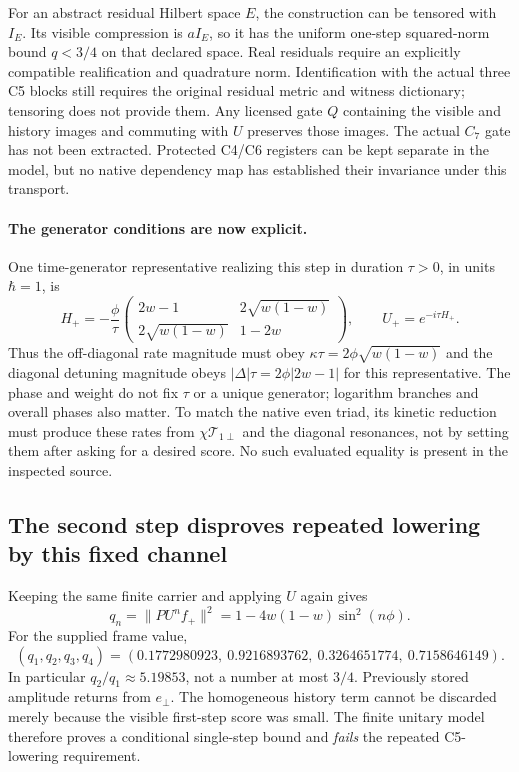 \documentclass[11pt,a4paper]{article}
\begin{document}
For an abstract residual Hilbert space $E$, the construction can
be tensored with $I_E$. Its visible compression is $aI_E$, so it
has the uniform one-step squared-norm bound $q<3/4$ on that
declared space. Real residuals require an explicitly compatible
realification and quadrature norm. Identification with the actual
three C5 blocks still requires the original residual metric and
witness dictionary; tensoring does not provide them.
Any licensed gate $Q$ containing the visible and history images
and commuting with $U$ preserves those images. The actual $C_7$
gate has not been extracted. Protected C4/C6 registers can be
kept separate in the model, but no native dependency map has
established their invariance under this transport.

\paragraph{The generator conditions are now explicit.}
One time-generator representative realizing this step in duration
$\tau>0$, in units $\hbar=1$, is
\[
 H_+=-\frac{\phi}{\tau}
 \begin{pmatrix}
 2w-1&2\sqrt{w(1-w)}\\
 2\sqrt{w(1-w)}&1-2w
 \end{pmatrix},\qquad U_+=e^{-i\tau H_+}.
\]
Thus the off-diagonal rate magnitude must obey
$\kappa\tau=2\phi\sqrt{w(1-w)}$ and the diagonal detuning
magnitude obeys $|\Delta|\tau=2\phi|2w-1|$ for this representative.
The phase and weight do not fix $\tau$ or a unique generator;
logarithm branches and overall phases also matter. To match the
native even triad, its kinetic reduction must produce these rates
from $\chi\mathcal T_{1\perp}$ and the diagonal resonances,
not by setting them after asking for a desired score.
No such evaluated equality is present in the inspected source.

\subsection{The second step disproves repeated lowering by this fixed channel}

Keeping the same finite carrier and applying $U$ again gives
\[
 q_n=\|PU^nf_+\|^2
     =1-4w(1-w)\sin^2(n\phi).
\]
For the supplied frame value,
\[
 (q_1,q_2,q_3,q_4)
 =(0.1772980923,\ 0.9216893762,\ 0.3264651774,\ 0.7158646149).
\]
In particular $q_2/q_1\approx5.19853$, not a number at most
$3/4$. Previously stored amplitude returns from $e_\perp$.
The homogeneous history term cannot be discarded merely because
the visible first-step score was small. The finite unitary model
therefore proves a conditional single-step bound and \emph{fails}
the repeated C5-lowering requirement.
\end{document}
